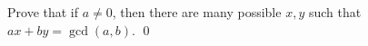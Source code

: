   Prove that if $a \neq 0$, then
  there are many possible $x, y$ such that
  $ax + by = \gcd(a,b)$.
  \qed

